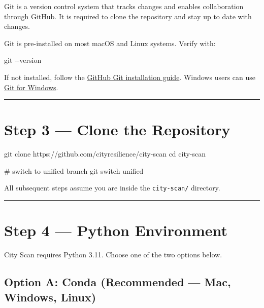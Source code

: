 \documentclass[
  letterpaper,
  DIV=11,
  numbers=noendperiod]{scrreprt}
\newenvironment{Shaded}{\begin{snugshade}}{\end{snugshade}}
\newcommand{\AttributeTok}[1]{\textcolor[rgb]{0.40,0.45,0.13}{#1}}
\newcommand{\BuiltInTok}[1]{\textcolor[rgb]{0.00,0.23,0.31}{#1}}
\newcommand{\CommentTok}[1]{\textcolor[rgb]{0.37,0.37,0.37}{#1}}
\newcommand{\FunctionTok}[1]{\textcolor[rgb]{0.28,0.35,0.67}{#1}}
\newcommand{\NormalTok}[1]{\textcolor[rgb]{0.00,0.23,0.31}{#1}}
\begin{document}
Git is a version control system that tracks changes and enables
collaboration through GitHub. It is required to clone the repository and
stay up to date with changes.

Git is pre-installed on most macOS and Linux systems. Verify with:

\begin{Shaded}
\begin{Highlighting}[]
\FunctionTok{git} \AttributeTok{{-}{-}version}
\end{Highlighting}
\end{Shaded}

If not installed, follow the
\href{https://github.com/git-guides/install-git}{GitHub Git installation
guide}. Windows users can use \href{https://gitforwindows.org/}{Git for
Windows}.

\begin{center}\rule{0.5\linewidth}{0.5pt}\end{center}

\section{Step 3 --- Clone the
Repository}\label{step-3-clone-the-repository}

\begin{Shaded}
\begin{Highlighting}[]
\FunctionTok{git}\NormalTok{ clone https://github.com/cityresilience/city{-}scan}
\BuiltInTok{cd}\NormalTok{ city{-}scan}

\CommentTok{\# switch to unified branch}
\FunctionTok{git}\NormalTok{ switch unified}
\end{Highlighting}
\end{Shaded}

All subsequent steps assume you are inside the \texttt{city-scan/}
directory.

\begin{center}\rule{0.5\linewidth}{0.5pt}\end{center}

\section{Step 4 --- Python Environment}\label{step-4-python-environment}

City Scan requires Python 3.11. Choose one of the two options below.

\subsection{Option A: Conda (Recommended --- Mac, Windows,
Linux)}\label{option-a-conda-recommended-mac-windows-linux}
\end{document}
